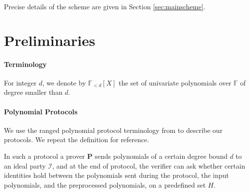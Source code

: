 \documentclass[11pt]{article} %
\newcommand{\F}{\ensuremath{\mathbb F}\xspace}
\newcommand{\prv}{\ensuremath{\mathsf{\mathbf{P}}}\xspace}
\newcommand{\ideal}{\ensuremath{\mathcal{I}}\xspace}
\newcommand{\polysofdeg}[1]{\ensuremath{\F_{< #1}[X]}\xspace}
\begin{document}
Precise details of the scheme are given in Section \ref{sec:mainscheme}.

\section{Preliminaries}
\paragraph{Terminology}
For integer $d$, we denote by \polysofdeg{d} the set of univariate polynomials over \F of degree smaller than $d$.
\paragraph{Polynomial Protocols}
We use the ranged polynomial protocol terminology from \cite{plonk} to describe our protocols. We repeat the definition for reference.

In such a protocol a prover \prv sends polynomials of a certain degree bound $d$ to an ideal party \ideal, and at the end of protocol, the verifier can ask whether certain identities hold between the polynomials sent during the protocol, the input polynomials, and the preprocessed polynomials, on a predefined set $H$.
\end{document}
